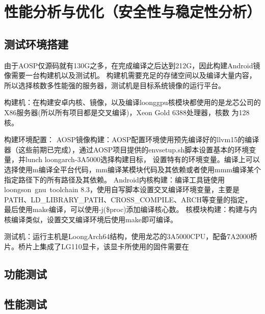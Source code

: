 
\chapter{性能分析与优化（安全性与稳定性分析）}

\section{测试环境搭建}
由于AOSP仅源码就有130G之多，在完成编译之后达到212G，因此构建Android镜像需要一台构建机以及测试机。
构建机需要充足的存储空间以及编译大量内容，所以选择核数多性能强的服务器，测试机是目标系统镜像的运行平台。

构建机：在构建安卓内核、镜像，以及编译loonggpu核模块都使用的是龙芯公司的X86服务器(所以所有项目都是交叉编译)，Xeon Gold 6388处理器，核数
为128核。

构建环境配置：
    AOSP镜像构建：AOSP配置环境使用预先编译好的llvm15的编译器（这些前期已完成），通过AOSP项目提供的envsetup.sh脚本设置基本的环境变量，并lunch loongarch-3A5000选择构建目标，
        设置特有的环境变量。编译上可以选择使用m编译全平台代码，mm编译某模块代码及其依赖或者使用mmm编译某个指定路径下的所有路径及其依赖。
    Android内核构建：编译工具链使用loongson\ gnu\ toolchain 8.3，使用自写脚本设置交叉编译环境变量，主要是PATH、LD\_LIBRARY\_PATH、CROSS\_COMPILE、ARCH等变量的指定，
        最后使用make编译，可以使用-j(\$proc)添加编译核心数。
    核模块构建：构建与内核编译类似，设置交叉编译环境后使用make即可编译。

测试机：运行主机是LoongArch64结构，使用龙芯的3A5000CPU，配备7A2000桥片。桥片上集成了LG110显卡，该显卡所使用的固件需要在


\section{功能测试}

\section{性能测试}



